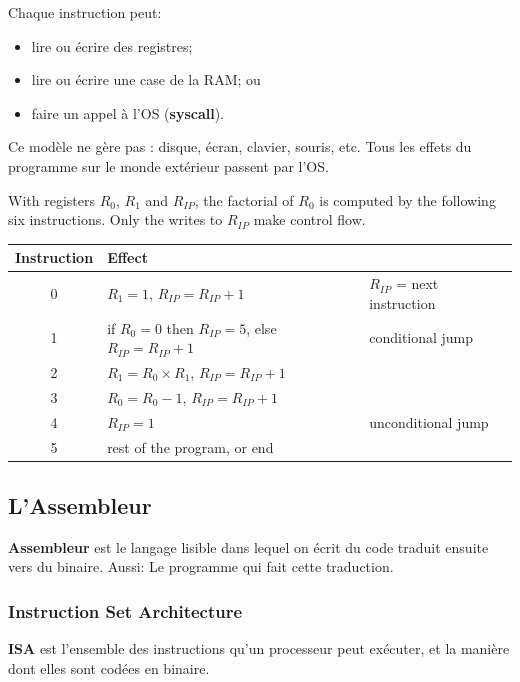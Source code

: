 Chaque instruction peut:
\begin{itemize}
  \item lire ou écrire des registres;
  \item lire ou écrire une case de la RAM; ou
  \item faire un appel à l'OS (\textbf{syscall}).
\end{itemize}

\begin{remark}
  Ce modèle ne gère pas : disque, écran, clavier, souris, etc. Tous les effets
  du programme sur le monde extérieur passent par l'OS.
\end{remark}

\begin{example}
  With registers $R_0$, $R_1$ and $R_{IP}$, the factorial of $R_0$ is computed
  by the following six instructions. Only the writes to $R_{IP}$ make control
  flow.

  \medskip
  \centering
  \begin{tabular}{c l l}
    \toprule
    Instruction & Effect & \\
    \midrule
    0 & $R_1 = 1$, \quad $R_{IP} = R_{IP} + 1$ & $R_{IP}$ = next instruction \\
    1 & if $R_0 = 0$ then $R_{IP} = 5$, else $R_{IP} = R_{IP} + 1$ & conditional jump \\
    2 & $R_1 = R_0 \times R_1$, \quad $R_{IP} = R_{IP} + 1$ & \\
    3 & $R_0 = R_0 - 1$, \quad $R_{IP} = R_{IP} + 1$ & \\
    4 & $R_{IP} = 1$ & unconditional jump \\
    5 & rest of the program, or end & \\
    \bottomrule
  \end{tabular}
\end{example}

\subsection{L'Assembleur}
\begin{definition}[Assembleur]
  \textbf{Assembleur} est le langage lisible dans lequel on écrit du code
  traduit ensuite vers du binaire. Aussi: Le programme qui fait cette traduction.
\end{definition}
\subsubsection{Instruction Set Architecture}
\begin{definition}
  \textbf{ISA} est l'ensemble des instructions qu'un processeur peut exécuter,
  et la manière dont elles sont codées en binaire.
\end{definition}

